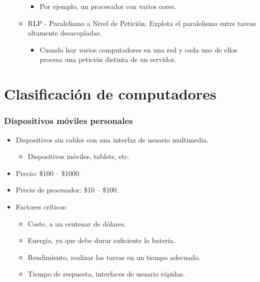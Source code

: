 \documentclass[12pt, twoside, openright]{report} %
\begin{document}
\begin{itemize}
\begin{itemize}
      \begin{itemize}
      
      \item
        Por ejemplo, un procesador con varios cores.
      \end{itemize}
    \item
      RLP - Paralelismo a Nivel de Petición: Explota el paralelismo
      entre tareas altamente desacopladas.

      \begin{itemize}
      
      \item
        Cuando hay varios computadores en una red y cada uno de ellos
        procesa una petición distinta de un servidor.
      \end{itemize}
    \end{itemize}
  \end{itemize}

  \section{Clasificación de computadores}

  
    \subsubsection{Dispositivos móviles personales}

    \begin{itemize}
    
    \item
      Dispositivos sin cables con una interfaz de usuario multimedia.

      \begin{itemize}
      
      \item
        Dispositivos móviles, tablets, etc.
      \end{itemize}
    \item
      Precio: \$100 -- \$1000.
    \item
      Precio de procesador: \$10 -- \$100.
    \item
      Factores críticos:

      \begin{itemize}
      
      \item
        Coste, a un centenar de dólares.
      \item
        Energía, ya que debe durar suficiente la batería.
      \item
        Rendimiento, realizar las tareas en un tiempo adecuado.
      \item
        Tiempo de respuesta, interfaces de usuario rápidas.
      \end{itemize}
    \end{itemize}
\end{document}
